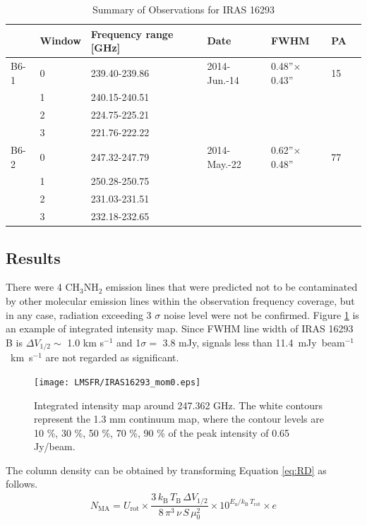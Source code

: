\renewcommand{\arraystretch}{1.5}
\begin{table}[htb]
\begin{center}
  \caption{Summary of Observations for IRAS 16293}
  \label{tab:Obs_IRAS16293}
{\scriptsize
  \begin{tabular}{lllllll} \hline \hline
 & Window & Frequency range [GHz] & Date & FWHM & PA \\ \hline
 B6-1 & 0 & 239.40-239.86 & 2014-Jun.-14 & 0.48''$\times$0.43'' & 15\\
 & 1 & 240.15-240.51 & & & \\
 & 2 & 224.75-225.21 & & & \\
 & 3 & 221.76-222.22 & & & \\ \hline
 B6-2 & 0 & 247.32-247.79 & 2014-May.-22 & 0.62''$\times$0.48'' & 77\\
 & 1 & 250.28-250.75 & & & \\
 & 2 & 231.03-231.51 & & & \\
 & 3 & 232.18-232.65 & & & \\ \hline
  \end{tabular}
  }
\end{center}
\end{table}

\subsection{Results}
There were 4 CH$_{3}$NH$_{2}$ emission lines that were predicted not to be contaminated 
by other molecular emission lines within the observation frequency coverage, 
but in any case, radiation exceeding 3 $\sigma$ noise level were not be confirmed.
Figure \ref{IRAS16293_mom0} is an example of integrated intensity map.
Since FWHM line width of IRAS 16293 B is $\Delta V_{1/2} \sim$ 1.0 km s$^{-1}$ and 1$\sigma=$ 3.8 mJy, 
signals less than 11.4~mJy~beam$^{-1}$~km~s$^{-1}$ are not regarded as significant.

\begin{figure}[htp]
  \centering
  \texttt{[image: LMSFR/IRAS16293\_mom0.eps]}
  \caption{Integrated intensity map around 247.362 GHz. The white contours represent the 1.3 mm continuum map, where the contour levels are 10 \%, 30 \%, 50 \%, 70 \%, 90 \% of the peak intensity of 0.65 Jy/beam.}
  \label{IRAS16293_mom0}
\end{figure}

The column density can be obtained by transforming Equation \ref{eq:RD} as follows.
\begin{align}
N_{\mathrm{MA}} = U_{\mathrm{rot}} \times \dfrac{3\,k_{\mathrm{B}}\,T_{\mathrm{B}} \,\Delta V_{1/2}}{8\, \pi^3\, \nu\, S\, \mu_0^2} \times 10^{E_{\mathrm{u}}/k_{\mathrm{B}}\,T_{\mathrm{rot}}} \times e
\label{eq:N_MA}
\end{align}


